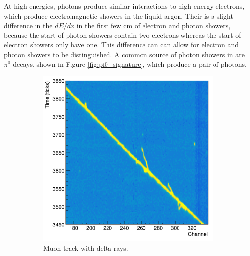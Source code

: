 At high energies, photons produce similar interactions to high energy electrons,
which produce electromagnetic showers in the liquid argon. Their is a slight
difference in the $dE/dx$ in the first few cm of electron and photon showers, 
because the start of photon showers contain two electrons whereas the start of
electron showers only have one. This difference can can allow for electron and 
photon showers to be distinguished\cite{Acciarri:2016sli}. A common source of 
photon showers in \protodune{} are $\pi^0$ decays, shown in Figure 
\ref{fig:pi0_signature}, which produce a pair of photons.
\begin{figure}

	\centering

	\begin{subfigure}[b]{0.49\textwidth}
		\centering
		\includegraphics[width=\textwidth]{figures/muon_signature.png}
		\caption{Muon track with delta rays.}
		\label{fig:muon_signature}
	\end{subfigure}
	\hfill
	\begin{subfigure}[b]{0.49\textwidth}
		\centering

\end{subfigure}
\end{figure}
